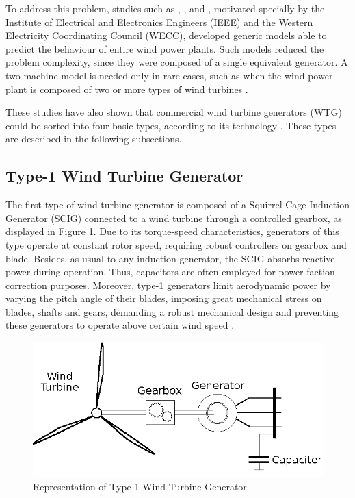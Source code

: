 To address this problem, studies such as \cite{Muljadi2008}, \cite{Ellis2011}, \cite{council2008wecc} and \cite{Asmine2011}, motivated specially by the Institute of Electrical and Electronics Engineers (IEEE) and the Western Electricity Coordinating Council (WECC), developed generic models able to predict the behaviour of entire wind power plants. Such models reduced the problem complexity, since they were composed of a single equivalent generator. A two-machine model is needed only in rare cases, such as when the wind power plant is composed of two or more types of wind turbines \cite{Ellis2011}.

These studies have also shown that commercial wind turbine generators (WTG) could be sorted into four basic types, according to its technology \cite{Ellis2011}. These types are described in the following subsections.

\subsection{Type-1 Wind Turbine Generator}

The first type of wind turbine generator is composed of a Squirrel Cage Induction Generator (SCIG) connected to a wind turbine through a controlled gearbox, as displayed in Figure \ref{fig: WTG1}. Due to its torque-speed characteristics, generators of this type operate at constant rotor speed, requiring robust controllers on gearbox and blade. Besides, as usual to any induction generator, the SCIG absorbs reactive power during operation. Thus, capacitors are often employed for power faction correction purposes. Moreover, type-1 generators limit aerodynamic power by varying the pitch angle of their blades, imposing great mechanical stress on blades, shafts and gears, demanding a robust mechanical design and preventing these generators to operate above certain wind speed \cite{Ellis2011}. 

\begin{figure}[h]
	\caption{Representation of Type-1 Wind Turbine Generator}
	\begin{center}
		\includegraphics[scale=1]{Images/Type1WTG.eps}
	\end{center}
	\label{fig: WTG1}
\end{figure}

